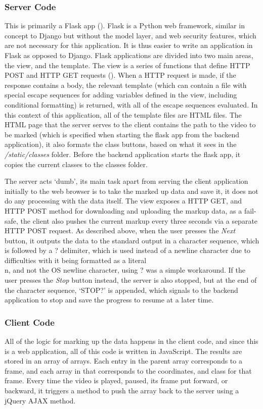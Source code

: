         \subsubsection{Server Code}
        This is primarily a Flask app (\cite{flaskpocoo}). Flask is a Python web framework, similar in concept to Django but without the model layer, and web security features, which are not necessary for this application. It is thus easier to write an application in Flask as opposed to Django. Flask applications are divided into two main areas, the view, and the template. The view is a series of functions that define HTTP POST and HTTP GET requests (\cite{fielding1999hypertext}). When a HTTP request is made, if the response contains a body, the relevant template (which can contain a file with special escape sequences for adding variables defined in the view, including conditional formatting) is returned, with all of the escape sequences evaluated. In this context of this application, all of the template files are HTML files. The HTML page that the server serves to the client contains the path to the video to be marked (which is specified when starting the flask app from the backend application), it also formats the class buttons, based on what it sees in the {\slshape /static/classes} folder. Before the backend application starts the flask app, it copies the current classes to the classes folder.
        
        The server acts `dumb', its main task apart from serving the client application initially to the web browser is to take the marked up data and save it, it does not do any processing with the data itself. The view exposes a HTTP GET, and HTTP POST method for downloading and uploading the markup data, as a fail-safe, the client also pushes the current markup every three seconds via a separate HTTP POST request. As described above, when the user presses the {\slshape Next} button, it outputs the data to the standard output in a character sequence, which is followed by a ? delimiter, which is used instead of a newline character due to difficulties with it being formatted as a literal \\n, and not the OS newline character, using ? was a simple workaround. If the user presses the {\slshape Stop} button instead, the server is also stopped, but at the end of the character sequence, `STOP?' is appended, which signals to the backend application to stop and save the progress to resume at a later time.

        \subsubsection{Client Code}
        All of the logic for marking up the data happens in the client code, and since this is a web application, all of this code is written in JavaScript. The results are stored in an array of arrays. Each entry in the parent array corresponds to a frame, and each array in that corresponds to the coordinates, and class for that frame. Every time the video is played, paused, its frame put forward, or backward, it triggers a method to push the array back to the server using a jQuery AJAX method.

